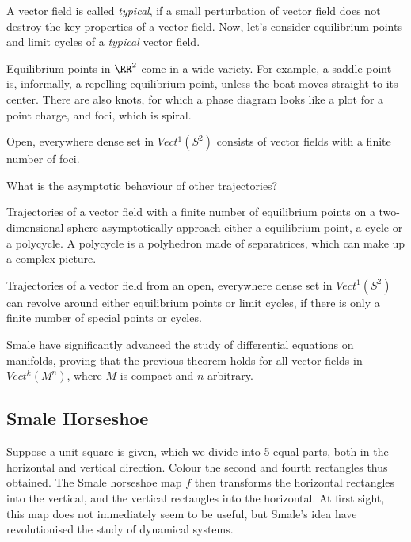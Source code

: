 \documentclass[11pt]{scrartcl}
\begin{document}
  A vector field is called \textit{typical}, if a small perturbation
  of vector field does not destroy the key properties of a vector
  field. Now, let's consider equilibrium points and limit cycles of a
  \textit{typical} vector field.

  Equilibrium points in $\RR^{2}$ come in a wide variety. For example,
  a saddle point is, informally, a repelling equilibrium point, unless
  the boat moves straight to its center. There are also knots, for
  which a phase diagram looks like a plot for a point charge, and
  foci, which is spiral.

  \begin{theorem}
    Open, everywhere dense set in $Vect^{1}(S^{2})$ consists of vector
    fields with a finite number of foci.
  \end{theorem}

  What is the asymptotic behaviour of other trajectories?

  Trajectories of a vector field with a finite number of equilibrium
  points on a two-dimensional sphere asymptotically approach either a
  equilibrium point, a cycle or a polycycle. A polycycle is a
  polyhedron made of separatrices, which can make up a complex
  picture.

  \begin{theorem}
    Trajectories of a vector field from an open, everywhere dense set
    in $Vect^{1}(S^{2})$ can revolve around either equilibrium points
    or limit cycles, if there is only a finite number of special
    points or cycles.
  \end{theorem}

  Smale have significantly advanced the study of differential
  equations on manifolds, proving that the previous theorem holds for
  all vector fields in $Vect^{k}(M^{n})$, where $M$ is compact and $n$
  arbitrary.

  \subsection{Smale Horseshoe}

  Suppose a unit square is given, which we divide into 5 equal parts,
  both in the horizontal and vertical direction. Colour the second and
  fourth rectangles thus obtained. The Smale horseshoe map $f$ then
  transforms the horizontal rectangles into the vertical, and the
  vertical rectangles into the horizontal. At first sight, this map
  does not immediately seem to be useful, but Smale's idea have
  revolutionised the study of dynamical systems.
\end{document}
